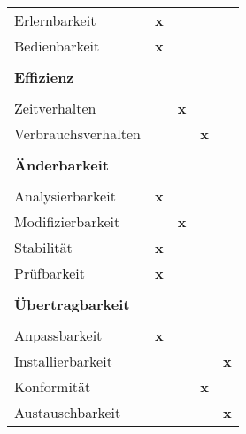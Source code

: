 \begin{table}[H]
\begin{tabular}{|lcccc|}
Erlernbarkeit         & \textbf{x}        &     &        &                \\[0.1cm]
Bedienbarkeit         & \textbf{x}        &     &        &                \\[0.1cm] 
\rowcolor[RGB]{230,230,230}\hline &&&& \\[-0.4cm]
\rowcolor[RGB]{230,230,230}\textbf{Effizienz}    &&&&								         		  \\[0.1cm] 
\hline &&&& \\[-0.4cm]
Zeitverhalten         &          & \textbf{x}   &        &                \\[0.1cm]
Verbrauchsverhalten   &          &     & \textbf{x}      &                \\[0.1cm] 
\rowcolor[RGB]{230,230,230}\hline &&&& \\[-0.35cm]
\rowcolor[RGB]{230,230,230}\textbf{Änderbarkeit} &&&&						                 		  \\[0.1cm] 
\hline &&&& \\[-0.4cm]
Analysierbarkeit      & \textbf{x}        &     &        &                \\[0.1cm]
Modifizierbarkeit     &          & \textbf{x}   &        &                \\[0.1cm]
Stabilität            & \textbf{x}        &     &        &                \\[0.1cm]
Prüfbarkeit           & \textbf{x}        &     &        &                \\[0.1cm] 
\rowcolor[RGB]{230,230,230}\hline &&&& \\[-0.35cm]
\rowcolor[RGB]{230,230,230}\textbf{Übertragbarkeit} &&&&							         		  \\[0.1cm] 
\hline &&&& \\[-0.4cm]
Anpassbarkeit         & \textbf{x}        &     &        &                \\[0.1cm]
Installierbarkeit     &          &     &        & \textbf{x}              \\[0.1cm]
Konformität           &          &     & \textbf{x}      &                \\[0.1cm]
Austauschbarkeit      &          &     &        & \textbf{x}              \\ \hline
\end{tabular}
\end{table}

